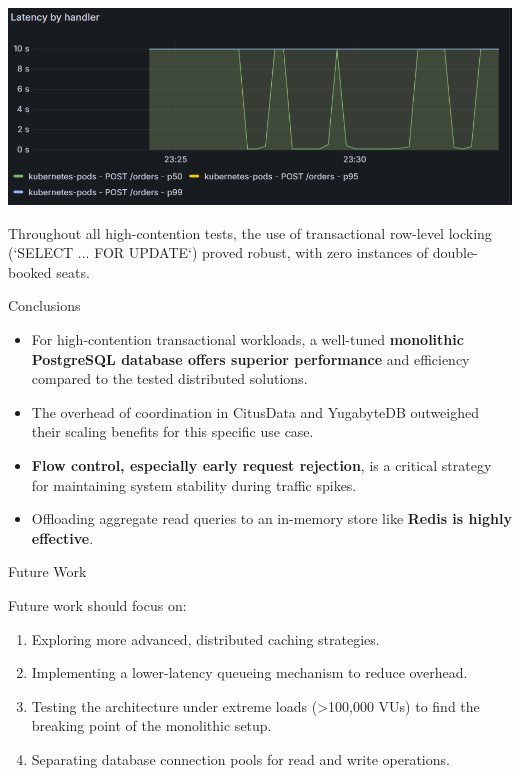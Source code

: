 \documentclass[a0,landscape]{config/poster/a0poster}
\newcommand{\postersection}[1]{%
  \begin{tcolorbox}[
    colback=IEEEblue,
    colframe=IEEEblue,
    fonttitle=\bfseries,
    coltext=white,
    sharp corners,
    boxrule=0pt,
    top=4pt,
    bottom=4pt,
    halign=center
  ]
    \large #1
  \end{tcolorbox}%
}
\begin{document}
\begin{multicols}{4}
    \begin{center}\vspace{0.5cm}
        \includegraphics[width=0.9\linewidth]{latency-fc-pg-stress-0.png}
    \end{center}\vspace{0.5cm}

    Throughout all high-contention tests, the use of transactional row-level locking (`SELECT ... FOR UPDATE`) proved robust, with zero instances of double-booked seats.


    \postersection{Conclusions}
    \begin{itemize}
        \item For high-contention transactional workloads, a well-tuned \textbf{monolithic PostgreSQL database offers superior performance} and efficiency compared to the tested distributed solutions.
        \item The overhead of coordination in CitusData and YugabyteDB outweighed their scaling benefits for this specific use case.
        \item \textbf{Flow control, especially early request rejection}, is a critical strategy for maintaining system stability during traffic spikes.
        \item Offloading aggregate read queries to an in-memory store like \textbf{Redis is highly effective}.
    \end{itemize}


    \postersection{Future Work}
    Future work should focus on:
    \begin{enumerate}
        \item Exploring more advanced, distributed caching strategies.
        \item Implementing a lower-latency queueing mechanism to reduce overhead.
        \item Testing the architecture under extreme loads (>100,000 VUs) to find the breaking point of the monolithic setup.
        \item Separating database connection pools for read and write operations.
    \end{enumerate}


\end{multicols}
\end{document}

